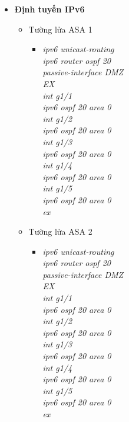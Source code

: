 \documentclass[a4paper, 12pt]{article}
\begin{document}
\begin{itemize}
       \item \textbf{Định tuyến IPv6}
      \begin{itemize}
        \item Tường lửa ASA 1
        \begin{itemize}
          \item \textit{ipv6 unicast-routing\\
                    	ipv6 router ospf 20\\
                        passive-interface DMZ\\
                        EX\\
                        int g1/1\\
                        ipv6 ospf 20 area 0\\
                        int g1/2\\
                        ipv6 ospf 20 area 0\\
                        int g1/3\\
                        ipv6 ospf 20 area 0\\
                        int g1/4\\
                        ipv6 ospf 20 area 0\\
                        int g1/5\\
                        ipv6 ospf 20 area 0\\
                        ex\\}
       
        \end{itemize}
        \item Tường lửa ASA 2
        \begin{itemize}
         \item \textit{ipv6 unicast-routing\\
                        ipv6 router ospf 20\\
                        passive-interface DMZ\\
                        EX\\
                        int g1/1\\
                        ipv6 ospf 20 area 0\\
                        int g1/2\\
                        ipv6 ospf 20 area 0\\
                        int g1/3\\
                        ipv6 ospf 20 area 0\\
                        int g1/4\\
                        ipv6 ospf 20 area 0\\
                        int g1/5\\
                        ipv6 ospf 20 area 0\\
                        ex\\}
        

\end{itemize}
\end{itemize}
\end{itemize}
\end{document}
